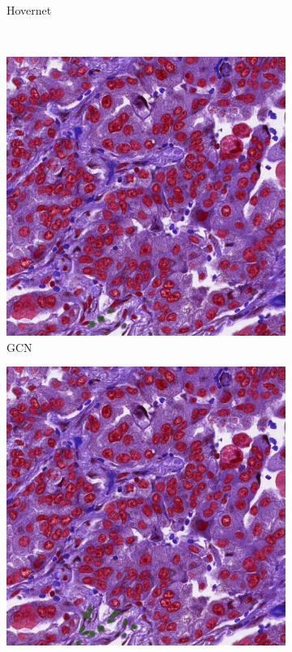 \begin{figure}[H]
\begin{subfigure}[b]{0.45\textwidth}
    \caption{Hovernet}
    \label{fig:monusac-hov3}
  \end{subfigure}
  \\
  \begin{subfigure}[b]{0.45\textwidth}
    \includegraphics[width=\textwidth]{imgs/qual/monusac/gcn-full3.png}
    \caption{GCN}
    \label{fig:monusac-gcn3}
  \end{subfigure}
  \hfill
  \begin{subfigure}[b]{0.45\textwidth}
    \includegraphics[width=\textwidth]{imgs/qual/monusac/no-morph3.png}

\end{subfigure}
\end{figure}
